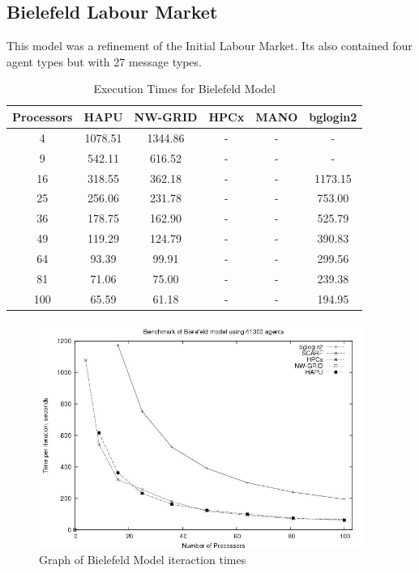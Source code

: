 \subsection{Bielefeld Labour Market}
This model was a refinement of the Initial Labour Market. Its also contained four agent types but with 27 message types.
{
\renewcommand{\arraystretch}{1.25}
\begin{table}[ht]
 \centering
  \begin{tabular}{c|ccccc}
 Processors &HAPU  &NW-GRID &HPCx  &MANO   &bglogin2 \\ \hline
4 &1078.51 &1344.86 &- &- &-    \\
9 &542.11 &616.52 &- &- &-      \\
16 &318.55 &362.18 &- &- &1173.15       \\
25 &256.06 &231.78 &- &- &753.00        \\
36 &178.75 &162.90 &- &- &525.79        \\
49 &119.29 &124.79 &- &- &390.83        \\
64 &93.39 &99.91 &- &- &299.56  \\
81 &71.06 &75.00 &- &- &239.38  \\
100 &65.59 &61.18 &- &- &194.95 \\
 \end{tabular}
 \caption{Execution Times for Bielefeld Model}
 \label{tab:ExecutionTimesForBielefeld}
\end{table}
}
\bigskip
\begin{figure}[ht]
 \centering
  \includegraphics[width=300pt]{Bielefeld2-graph.jpg}
 \caption{Graph of Bielefeld Model iteraction times}
 \label{fig:Labour-graph2}
\end{figure}


